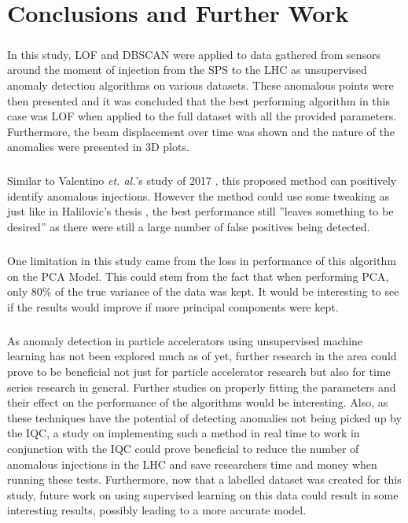 \chapter{Conclusions and Further Work}
\label{chp6}
\paragraph{ }In this study, \acs{LOF} and \acs{DBSCAN} were applied to data gathered from sensors around the moment of injection from the \acs{SPS} to the \acs{LHC} as unsupervised anomaly detection algorithms on various datasets. These anomalous points were then presented and it was concluded that the best performing algorithm in this case was \acs{LOF} when applied to the full dataset with all the provided parameters. Furthermore, the beam displacement over time was shown and the nature of the anomalies were presented in 3D plots.

\paragraph{ }Similar to Valentino \textit{et. al.}'s study of 2017 \cite{Valentino2017}, this proposed method can positively identify anomalous injections. However the method could use some tweaking as just like in Halilovic's thesis \cite{Halilovic2018}, the best performance still ''leaves something to be desired'' as there were still a large number of false positives being detected.

\paragraph{ }One limitation in this study came from the loss in performance of this algorithm on the \acs{PCA} Model. This could stem from the fact that when performing \acs{PCA}, only 80\% of the true variance of the data was kept. It would be interesting to see if the results would improve if more principal components were kept.

\paragraph{ }As anomaly detection in particle accelerators using unsupervised machine learning has not been explored much as of yet, further research in the area could prove to be beneficial not just for particle accelerator research but also for time series research in general. Further studies on properly fitting the parameters and their effect on the performance of the algorithms would be interesting. Also, as these techniques have the potential of detecting anomalies not being picked up by the \acs{IQC}, a study on implementing such a method in real time to work in conjunction with the \acs{IQC} could prove beneficial to reduce the number of anomalous injections in the \acs{LHC} and save researchers time and money when running these tests. Furthermore, now that a labelled dataset was created for this study, future work on using supervised learning on this data could result in some interesting results, possibly leading to a more accurate model.